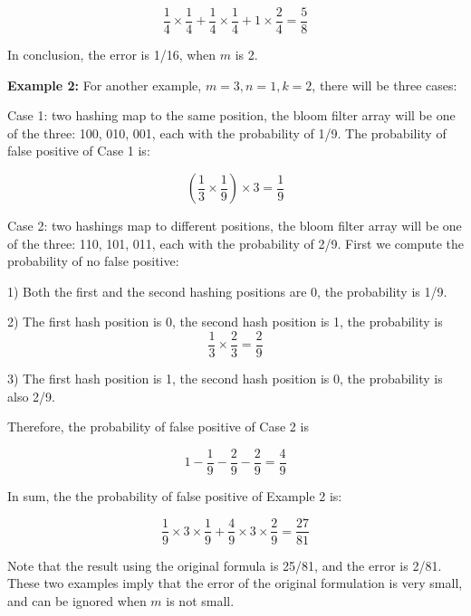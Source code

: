 \begin{equation}
\dfrac{1}{4}\times \dfrac{1}{4} +\dfrac{1}{4}\times \dfrac{1}{4} +1 \times \dfrac{2}{4}=\dfrac{5}{8}
\end{equation} 

In conclusion, the error is 1/16, when $m$ is 2.


\textbf{Example 2:}
For another example, $m=3,n=1,k=2$, there will be three cases:

Case 1: two hashing map to the same position, the bloom filter array will be one of the three: 100, 010, 001, each with the probability of 1/9. The probability of false positive of Case 1 is: 

\begin{equation}
(\dfrac{1}{3} \times \dfrac{1}{9} ) \times 3 = \dfrac{1}{9}
\end{equation} 

Case 2: two hashings map to different positions, the bloom filter array will be one of the three: 110, 101, 011, each with the probability of 2/9. First we compute the probability of no false positive:

1) Both the first and the second hashing positions are 0, the probability is 1/9.

2) The first hash position is 0, the second hash position is 1, the probability is 
\begin{equation}
\dfrac{1}{3} \times \dfrac{2}{3} = \dfrac{2}{9}
\end{equation} 

3) The first hash position is 1, the second hash position is 0, the probability is also 2/9.

Therefore, the probability of false positive of Case 2 is

\begin{equation}
1-\dfrac{1}{9}-\dfrac{2}{9}-\dfrac{2}{9}=\dfrac{4}{9}
\end{equation}

In sum, the the probability of false positive of Example 2 is:


\begin{equation}
\frac{1}{9}\times 3 \times \frac{1}{9}+ \frac{4}{9}\times 3\times \frac{2}{9}=\dfrac{27}{81}
\end{equation}

Note that the result using the original formula is 25/81, and the error is 2/81.
These two examples imply that the error of the original formulation is very small, and can be ignored when $m$ is not small. 

%
%
%
%
